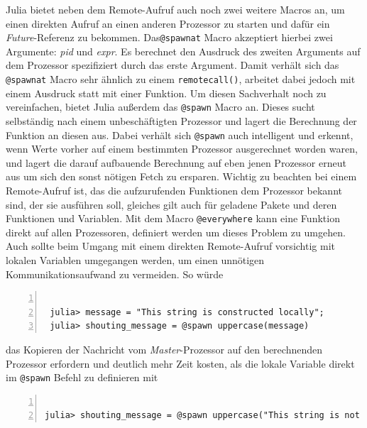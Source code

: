 \documentclass[proseminar,german,utf8]{zihpub}
\begin{document}
Julia bietet neben dem Remote-Aufruf auch noch zwei weitere Macros an, um einen direkten Aufruf an einen anderen Prozessor zu starten und dafür ein \textit{Future}-Referenz zu bekommen. Das\verb|@spawnat| Macro akzeptiert hierbei zwei Argumente: \textit{pid} und \textit{expr}. Es berechnet den Ausdruck des zweiten Arguments auf dem Prozessor spezifiziert durch das erste Argument.  Damit verhält sich das \verb|@spawnat| Macro sehr ähnlich zu einem \verb|remotecall()|, arbeitet dabei jedoch mit einem Ausdruck statt mit einer Funktion. Um diesen Sachverhalt noch zu vereinfachen, bietet Julia außerdem das \verb|@spawn| Macro an. Dieses sucht selbständig nach einem unbeschäftigten Prozessor und lagert die Berechnung der Funktion an diesen aus. Dabei verhält sich \verb|@spawn| auch intelligent und erkennt, wenn Werte vorher auf einem bestimmten Prozessor ausgerechnet worden waren, und lagert die darauf aufbauende Berechnung auf eben jenen Prozessor erneut aus um sich den sonst nötigen Fetch zu ersparen. Wichtig zu beachten bei einem Remote-Aufruf ist, das die aufzurufenden Funktionen dem Prozessor bekannt sind, der sie ausführen soll, gleiches gilt auch für geladene Pakete und deren Funktionen und Variablen. Mit dem Macro \verb|@everywhere| kann eine Funktion direkt auf allen Prozessoren, definiert werden um dieses Problem zu umgehen. Auch sollte beim Umgang mit einem direkten Remote-Aufruf vorsichtig mit lokalen Variablen umgegangen werden, um einen unnötigen Kommunikationsaufwand zu vermeiden. So würde

\begin{Verbatim}[baselinestretch=1,fontsize=\scriptsize,numbers=left,stepnumber=5,xleftmargin=1cm,xrightmargin=1cm]

 julia> message = "This string is constructed locally";
 julia> shouting_message = @spawn uppercase(message)

\end{Verbatim} 

das Kopieren der Nachricht vom \textit{Master}-Prozessor auf den berechnenden Prozessor erfordern und deutlich mehr Zeit kosten, als die lokale Variable direkt im \verb|@spawn| Befehl zu definieren mit 
\begin{Verbatim}[baselinestretch=1,fontsize=\scriptsize,numbers=left,stepnumber=5,xleftmargin=1cm]

julia> shouting_message = @spawn uppercase("This string is not constructed locally")

\end{Verbatim}
\end{document}
